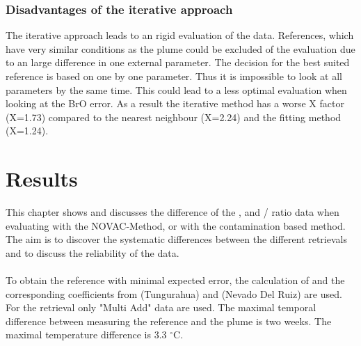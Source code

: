 \documentclass  [
  paper    = a4,
  BCOR     = 10mm,
  twoside,
  fontsize = 12pt,
  fleqn,
  toc      = bibnumbered,
  toc      = listofnumbered,
  numbers  = noendperiod,
  headings = normal,
  listof   = leveldown,
  version  = 3.03
]                                       {scrreprt}
\begin{document}
	\subsection*{Disadvantages of the iterative approach}
	The iterative approach leads to an rigid evaluation of the data. References, which have very similar conditions as the plume could be excluded of the evaluation due to an large difference in one external parameter. The decision for the best suited reference is based on one by one parameter. Thus it is impossible to look at all parameters by the same time.   This could lead to a less optimal evaluation when looking at the BrO error.
	As a result the iterative method has a worse X factor (X=1.73) compared to the nearest neighbour (X=2.24) and the fitting method (X=1.24).
	
	\chapter{Results}
	This chapter shows and discusses the difference of the ,  and /  ratio data when evaluating with the NOVAC-Method, or with the contamination based method.
	The aim is to discover the systematic differences between the different retrievals and to discuss the reliability of the data.\\
	\\
	To obtain the reference with minimal expected   error, the calculation of  and the corresponding coefficients from  (Tungurahua) and  (Nevado Del Ruiz) are used. 
	For the retrieval only "Multi Add" data are used. The maximal temporal difference between measuring the reference and the plume is two weeks. The maximal temperature difference is 3.3 $^{\circ}$C.\\
\end{document}
